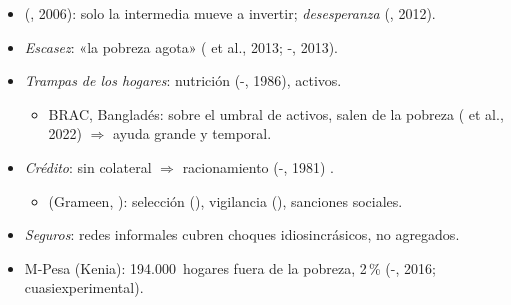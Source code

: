 \documentclass{article}
\begin{document}
\begin{columnas}
\begin{itemize}
\item {} (, 2006): solo la intermedia mueve a invertir; \emph{desesperanza} (, 2012).
\item \emph{Escasez}: «la pobreza agota» ( et al., 2013; -, 2013).
\item \emph{Trampas de los hogares}: nutrición (-, 1986), activos.
  \begin{itemize}
  \item BRAC, Bangladés: sobre el umbral de activos, salen de la pobreza ( et al., 2022) $\Rightarrow$ ayuda grande y temporal.
  \end{itemize}
\end{itemize}
\begin{itemize}
\item \emph{Crédito}: sin colateral $\Rightarrow$ racionamiento (-, 1981) .
  \begin{itemize}
  \item {} (Grameen, ): selección (), vigilancia (), sanciones sociales.
  \end{itemize}
\item \emph{Seguros}: redes informales cubren choques idiosincrásicos, no agregados.
\item M-Pesa (Kenia): 194.000~hogares fuera de la pobreza, 2\,\% (-, 2016; cuasiexperimental).
\end{itemize}


\end{columnas}
\end{document}
